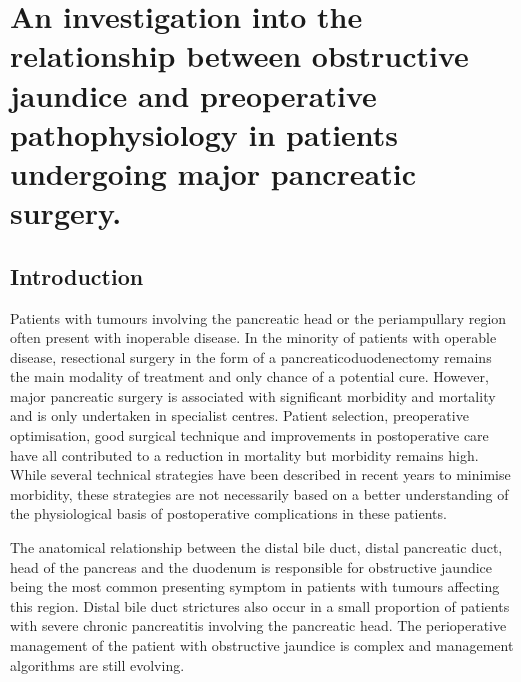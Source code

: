 
\chapter{An investigation into the relationship between obstructive jaundice and preoperative pathophysiology in patients undergoing major pancreatic surgery.}

\label{ch_cpet_jaundice}


\clearpage


\section{Introduction}
Patients with tumours involving the pancreatic head or the periampullary region often present with inoperable disease. 
In the minority of patients with operable disease, resectional surgery in the form of a pancreaticoduodenectomy remains the main modality of treatment and only chance of a potential cure. 
However, major pancreatic surgery is associated with significant morbidity and mortality and is only undertaken in specialist centres. 
Patient selection, preoperative optimisation, good surgical technique and improvements in postoperative care have all contributed to a reduction in mortality \parencite{winter_1423_2006} but morbidity remains high. 
While several technical strategies have been described in recent years to minimise morbidity, these strategies are not necessarily based on a better understanding of the physiological basis of postoperative complications in these patients.

The anatomical relationship between the distal bile duct, distal pancreatic duct, head of the pancreas and the duodenum is responsible for obstructive jaundice being the most common presenting symptom in patients with tumours affecting this region. 
Distal bile duct strictures also occur in a small proportion of patients with severe chronic pancreatitis involving the pancreatic head. 
The perioperative management of the patient with obstructive jaundice is complex and management algorithms are still evolving. 

